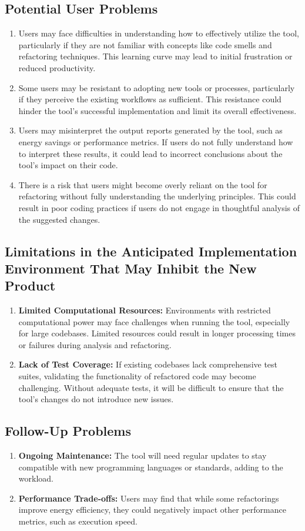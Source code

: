 \documentclass[12pt]{article}
\begin{document}
\subsection{Potential User Problems}
\begin{enumerate}
  \item Users may face difficulties in understanding how to effectively utilize the tool, particularly if they are not familiar with concepts like code smells and refactoring techniques. This learning curve may lead to initial frustration or reduced productivity.
  \item Some users may be resistant to adopting new tools or processes, particularly if they perceive the existing workflows as sufficient. This resistance could hinder the tool's successful implementation and limit its overall effectiveness.
  \item Users may misinterpret the output reports generated by the tool, such as energy savings or performance metrics. If users do not fully understand how to interpret these results, it could lead to incorrect conclusions about the tool's impact on their code.
  \item There is a risk that users might become overly reliant on the tool for refactoring without fully understanding the underlying principles. This could result in poor coding practices if users do not engage in thoughtful analysis of the suggested changes.
\end{enumerate}
\subsection{Limitations in the Anticipated Implementation Environment That May
Inhibit the New Product}
\begin{enumerate}
  \item \textbf{Limited Computational Resources:} Environments with restricted computational power may face challenges when running the tool, especially for large codebases. Limited resources could result in longer processing times or failures during analysis and refactoring.
  \item \textbf{Lack of Test Coverage:} If existing codebases lack comprehensive test suites, validating the functionality of refactored code may become challenging. Without adequate tests, it will be difficult to ensure that the tool's changes do not introduce new issues.
\end{enumerate}
\subsection{Follow-Up Problems}
\begin{enumerate}
  \item \textbf{Ongoing Maintenance:} The tool will need regular updates to stay compatible with new programming languages or standards, adding to the workload.
  \item \textbf{Performance Trade-offs:} Users may find that while some refactorings improve energy efficiency, they could negatively impact other performance metrics, such as execution speed.
\end{enumerate}
\end{document}

